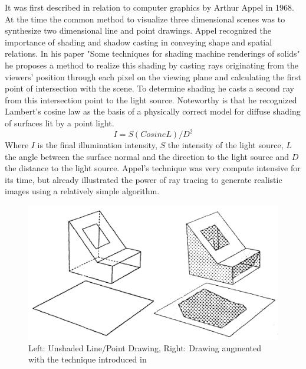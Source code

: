 \documentclass{ACGSeminar}
\begin{document}
It was first described in relation to computer graphics by Arthur Appel in 1968. At the time the common method to visualize three dimensional scenes was to synthesize two dimensional line and point drawings. Appel recognized the importance of shading and shadow casting in conveying shape and spatial relations. In his paper "Some techniques for shading machine renderings of solids" he proposes a method to realize this shading by casting rays originating from the viewers' position through each pixel on the viewing plane and calculating the first point of intersection with the scene. To determine shading he casts a second ray from this intersection point to the light source. Noteworthy is that he recognized Lambert's cosine law as the basis of a physically correct model for diffuse shading of surfaces lit by a point light.
\begin{equation}
I = S (Cosine L)/D^{2}
\end{equation}
Where $I$ is the final illumination intensity, $S$ the intensity of the light source, $L$ the angle between the surface normal and the direction to the light source and $D$ the distance to the light source.
Appel's technique was very compute intensive for its time, but already illustrated the power of ray tracing to generate realistic images using a relatively simple algorithm. \cite{Appel68}

\begin{figure}[htb!]
  \begin{centering}
    \includegraphics[width=12cm]{figures/Appel_Shading.png}\par
  \end{centering}
  \caption{Left: Unshaded Line/Point Drawing, Right: Drawing augmented with the technique introduced in \cite{Appel68}}
  \label{fig:appel_tracing}
\end{figure}
\end{document}
